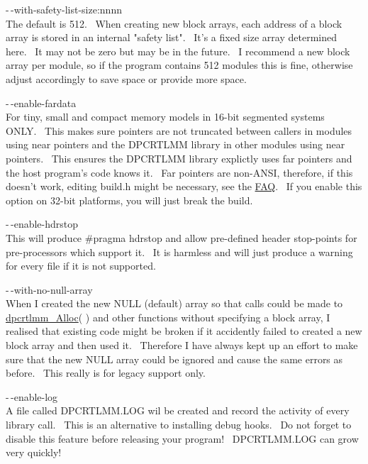 \documentclass{article}
\begin{document}
\par -$\,$-with-safety-list-size:nnnn
\\
The default is 512.~ When creating new block arrays, each address
of a block array is stored in an internal "safety list".~ It's a
fixed
size array determined here.~ It may not be zero but may be in the
future.~ I recommend a new block array per module, so if the
program
contains 512 modules this is fine, otherwise adjust accordingly to save
space or provide more space.

\par -$\,$-enable-fardata
\\
For tiny, small and compact memory models in 16-bit segmented systems
ONLY.~ This makes sure pointers are not truncated between callers
in modules using near pointers and the DPCRTLMM library in other
modules
using near pointers.~ This ensures the DPCRTLMM library explictly
uses far pointers and the host program's code knows it.~ Far
pointers are non-ANSI, therefore, if this doesn't work,
editing build.h might be necessary, see the \href{#FAQ}{FAQ}.~
If you enable this option on 32-bit platforms, you will just break the
build.\\

\par -$\,$-enable-hdrstop\\
This will produce \#pragma hdrstop and allow pre-defined header
stop-points for pre-processors which support it.~ It is harmless
and will just produce a warning for every file if it is not supported.\\

\par -$\,$-with-no-null-array\\
When I created the new NULL (default) array so that calls could be
made to \href{#Alloc}{dpcrtlmm\_Alloc}( ) and other functions
without
specifying a block array, I realised that existing code might be broken
if it accidently failed to created a new block array and then used
it.~
Therefore I have always kept up an effort to make sure that the new
NULL
array could be ignored and cause the same errors as before.~ This
really is for legacy support only.\\

\par -$\,$-enable-log
\\
A file called DPCRTLMM.LOG wil be created and record the activity of
every library call.~ This is an alternative to installing debug
hooks.~ Do not forget to disable this feature before releasing
your program!~ DPCRTLMM.LOG can grow very quickly!\\
\end{document}
